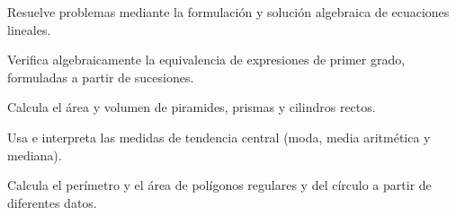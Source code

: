\item Resuelve problemas mediante la formulación y solución algebraica de ecuaciones lineales.
\item Verifica algebraicamente la equivalencia de expresiones de primer grado, formuladas a partir de sucesiones.
\item Calcula el área y volumen de piramides, prismas y cilindros rectos.
\item Usa e interpreta las medidas de tendencia central (moda, media aritmética y mediana).
\item Calcula el perímetro y el área de polígonos regulares y del círculo a partir de diferentes datos.